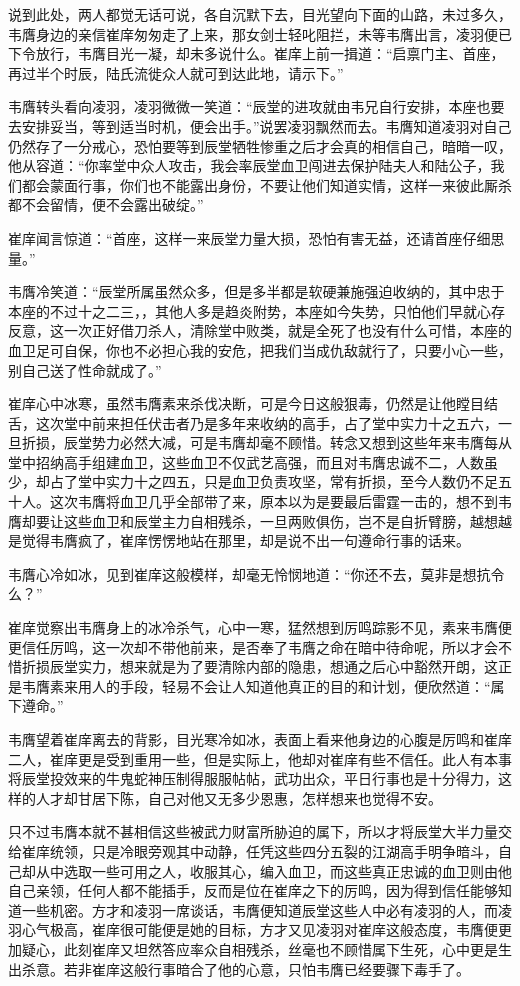 说到此处，两人都觉无话可说，各自沉默下去，目光望向下面的山路，未过多久，韦膺身边的亲信崔庠匆匆走了上来，那女剑士轻叱阻拦，未等韦膺出言，凌羽便已下令放行，韦膺目光一凝，却未多说什么。崔庠上前一揖道：“启禀门主、首座，再过半个时辰，陆氏流徙众人就可到达此地，请示下。”

韦膺转头看向凌羽，凌羽微微一笑道：“辰堂的进攻就由韦兄自行安排，本座也要去安排妥当，等到适当时机，便会出手。”说罢凌羽飘然而去。韦膺知道凌羽对自己仍然存了一分戒心，恐怕要等到辰堂牺牲惨重之后才会真的相信自己，暗暗一叹，他从容道：“你率堂中众人攻击，我会率辰堂血卫闯进去保护陆夫人和陆公子，我们都会蒙面行事，你们也不能露出身份，不要让他们知道实情，这样一来彼此厮杀都不会留情，便不会露出破绽。”

崔庠闻言惊道：“首座，这样一来辰堂力量大损，恐怕有害无益，还请首座仔细思量。”

韦膺冷笑道：“辰堂所属虽然众多，但是多半都是软硬兼施强迫收纳的，其中忠于本座的不过十之二三，，其他人多是趋炎附势，本座如今失势，只怕他们早就心存反意，这一次正好借刀杀人，清除堂中败类，就是全死了也没有什么可惜，本座的血卫足可自保，你也不必担心我的安危，把我们当成仇敌就行了，只要小心一些，别自己送了性命就成了。”

崔庠心中冰寒，虽然韦膺素来杀伐决断，可是今日这般狠毒，仍然是让他瞠目结舌，这次堂中前来担任伏击者乃是多年来收纳的高手，占了堂中实力十之五六，一旦折损，辰堂势力必然大减，可是韦膺却毫不顾惜。转念又想到这些年来韦膺每从堂中招纳高手组建血卫，这些血卫不仅武艺高强，而且对韦膺忠诚不二，人数虽少，却占了堂中实力十之四五，只是血卫负责攻坚，常有折损，至今人数仍不足五十人。这次韦膺将血卫几乎全部带了来，原本以为是要最后雷霆一击的，想不到韦膺却要让这些血卫和辰堂主力自相残杀，一旦两败俱伤，岂不是自折臂膀，越想越是觉得韦膺疯了，崔庠愣愣地站在那里，却是说不出一句遵命行事的话来。

韦膺心冷如冰，见到崔庠这般模样，却毫无怜悯地道：“你还不去，莫非是想抗令么？”

崔庠觉察出韦膺身上的冰冷杀气，心中一寒，猛然想到厉鸣踪影不见，素来韦膺便更信任厉鸣，这一次却不带他前来，是否奉了韦膺之命在暗中待命呢，所以才会不惜折损辰堂实力，想来就是为了要清除内部的隐患，想通之后心中豁然开朗，这正是韦膺素来用人的手段，轻易不会让人知道他真正的目的和计划，便欣然道：“属下遵命。”

韦膺望着崔庠离去的背影，目光寒冷如冰，表面上看来他身边的心腹是厉鸣和崔庠二人，崔庠更是受到重用一些，但是实际上，他却对崔庠有些不信任。此人有本事将辰堂投效来的牛鬼蛇神压制得服服帖帖，武功出众，平日行事也是十分得力，这样的人才却甘居下陈，自己对他又无多少恩惠，怎样想来也觉得不安。

只不过韦膺本就不甚相信这些被武力财富所胁迫的属下，所以才将辰堂大半力量交给崔庠统领，只是冷眼旁观其中动静，任凭这些四分五裂的江湖高手明争暗斗，自己却从中选取一些可用之人，收服其心，编入血卫，而这些真正忠诚的血卫则由他自己亲领，任何人都不能插手，反而是位在崔庠之下的厉鸣，因为得到信任能够知道一些机密。方才和凌羽一席谈话，韦膺便知道辰堂这些人中必有凌羽的人，而凌羽心气极高，崔庠很可能便是她的目标，方才又见凌羽对崔庠这般态度，韦膺便更加疑心，此刻崔庠又坦然答应率众自相残杀，丝毫也不顾惜属下生死，心中更是生出杀意。若非崔庠这般行事暗合了他的心意，只怕韦膺已经要骤下毒手了。

